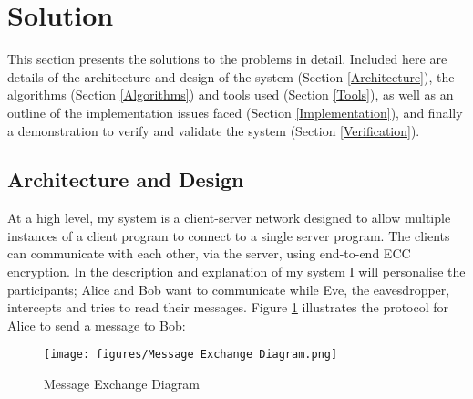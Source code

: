 \documentclass[12pt,a4paper]{article}
\begin{document}


%

\section{Solution} \noindent
This section presents the solutions to the problems in detail. 
Included here are details of the architecture and design of the system (Section \ref{Architecture}), 
the algorithms (Section \ref{Algorithms}) and tools used (Section \ref{Tools}), 
as well as an outline of the implementation issues faced (Section \ref{Implementation}), 
and finally a demonstration to verify and validate the system (Section \ref{Verification}). 

\subsection{Architecture and Design} \noindent \label{Architecture}
At a high level, my system is a client-server network designed to allow 
multiple instances of a client program to connect to a single server program. 
The clients can communicate with each other, via the server, using end-to-end ECC encryption. 
In the description and explanation of my system I will personalise the participants; 
Alice and Bob want to communicate while Eve, the eavesdropper, intercepts and tries to read their messages. 
Figure \ref{fig:messages} illustrates the protocol for Alice to send a message to Bob: 

\begin{figure}[!htb]
    \centering
    \texttt{[image: figures/Message Exchange Diagram.png]}
    \caption{Message Exchange Diagram}
    \label{fig:messages}
\end{figure}
\end{document}
